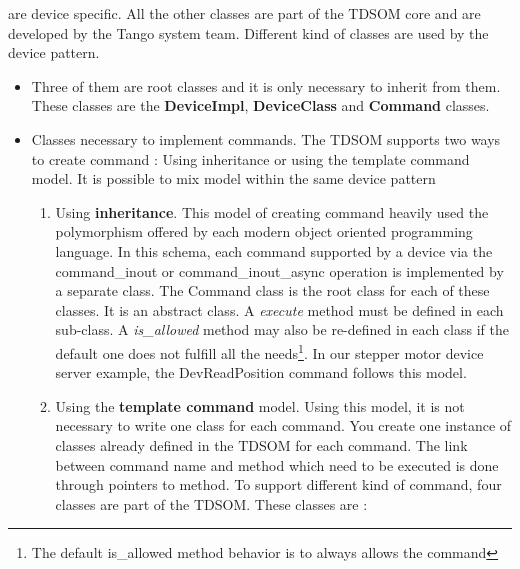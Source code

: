 are device specific. All the other classes are part of the TDSOM core
and are developed by the Tango system team. Different kind of classes
are used by the device pattern. 
\begin{itemize}
\item Three of them are root classes and it is only necessary to inherit
from them. These classes are the \textbf{DeviceImpl},
\textbf{DeviceClass} and \textbf{Command}
classes. 
\item Classes necessary to implement commands. The TDSOM
supports two ways to create command : Using inheritance
or using the template command model. It is possible
to mix model within the same device pattern

\begin{enumerate}
\item Using \textbf{inheritance}. This model of creating command heavily
used the polymorphism offered by each modern object oriented programming
language. In this schema, each command supported by a device via the
command\_inout or command\_inout\_async
operation is implemented by a separate class. The Command
class is the root class for each of these classes. It is an abstract
class. A \emph{execute} method must be defined in
each sub-class. A \emph{is\_allowed} method may
also be re-defined in each class if the default one does not fulfill
all the needs\footnote{The default is\_allowed method behavior is to always allows the command}.
In our stepper motor device server example, the DevReadPosition command
follows this model.
\item Using the \textbf{template command} model. Using this model, it is
not necessary to write one class for each command. You create one
instance of classes already defined in the TDSOM for each command.
The link between command name and method which need to be executed
is done through pointers to method. To support different kind of command,
four classes are part of the TDSOM. These classes are :


\end{enumerate}
\end{itemize}
